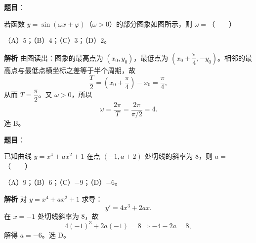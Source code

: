 \begin{answer}

\textbf{题目}：

若函数 $y=\sin(\omega x+\varphi)$（$\omega>0$）的部分图象如图所示，则 $\omega=$\mbox{（　　）}
\nopagebreak[4]
\begin{center}\end{center}
\nopagebreak[4]
（A）$5$；（B）$4$；（C）$3$；（D）$2$。

\textbf{解析}
由图读出：图象的最高点为 $(x_0,y_0)$，最低点为 $\left(x_0+\dfrac\pi4,-y_0\right)$。相邻的最高点与最低点横坐标之差等于半个周期，故
\nopagebreak[4]
\[\frac T2=\left(x_0+\frac\pi4\right)-x_0=\frac\pi4,\]
从而 $T=\dfrac\pi2$。又 $\omega>0$，所以
\nopagebreak[4]
\[\omega=\frac{2\pi}T=\frac{2\pi}{\pi/2}=4.\]
选 B。


\end{answer}
\begin{answer}

\textbf{题目}：

已知曲线 $y=x^4+ax^2+1$ 在点 $(-1,a+2)$ 处切线的斜率为 $8$，则 $a=$\mbox{（　　）}

（A）$9$；（B）$6$；（C）$-9$；（D）$-6$。

\textbf{解析}
对 $y=x^4+ax^2+1$ 求导：
\nopagebreak[4]
\[y'=4x^3+2ax.\]
在 $x=-1$ 处切线斜率为 $8$，故
\nopagebreak[4]
\[4(-1)^3+2a(-1)=8\Longrightarrow -4-2a=8,\]
解得 $a=-6$。选 D。


\end{answer}
